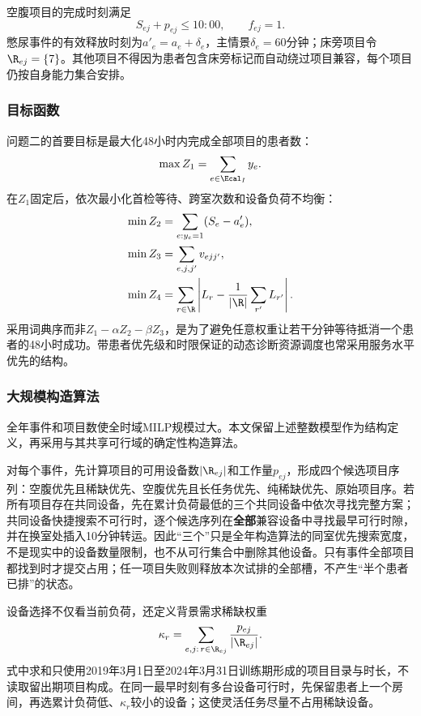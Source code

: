 空腹项目的完成时刻满足
\begin{equation}
  S_{ej}+p_{ej}\leq 10{:}00,
  \qquad f_{ej}=1.
\end{equation}
憋尿事件的有效释放时刻为$a'_e=a_e+\delta_e$，主情景$\delta_e=60$分钟；床旁项目令$\R_{ej}=\{7\}$。其他项目不得因为患者包含床旁标记而自动绕过项目兼容，每个项目仍按自身能力集合安排。

\subsubsection{目标函数}

问题二的首要目标是最大化48小时内完成全部项目的患者数：
\begin{equation}
  \max Z_1=\sum_{e\in\Ecal_I}y_e.
  \label{eq:p2-primary}
\end{equation}
在$Z_1$固定后，依次最小化首检等待、跨室次数和设备负荷不均衡：
\begin{align}
  \min Z_2&=\sum_{e:y_e=1}(S_e-a'_e),\\
  \min Z_3&=\sum_{e,j,j'}v_{ejj'},\\
  \min Z_4&=\sum_{r\in\R}\left|L_r-\frac{1}{|\R|}\sum_{r'}L_{r'}\right|.
\end{align}
采用词典序而非$Z_1-\alpha Z_2-\beta Z_3$，是为了避免任意权重让若干分钟等待抵消一个患者的48小时成功。带患者优先级和时限保证的动态诊断资源调度也常采用服务水平优先的结构\cite{patrick2008,bauerhenne2026}。

\subsubsection{大规模构造算法}

全年事件和项目数使全时域MILP规模过大。本文保留上述整数模型作为结构定义，再采用与其共享可行域的确定性构造算法。

对每个事件，先计算项目的可用设备数$|\R_{ej}|$和工作量$p_{ej}$，形成四个候选项目序列：空腹优先且稀缺优先、空腹优先且长任务优先、纯稀缺优先、原始项目序。若所有项目存在共同设备，先在累计负荷最低的三个共同设备中依次寻找完整方案；共同设备快捷搜索不可行时，逐个候选序列在\textbf{全部}兼容设备中寻找最早可行时隙，并在换室处插入10分钟转运。因此“三个”只是全年构造算法的同室优先搜索宽度，不是现实中的设备数量限制，也不从可行集合中删除其他设备。只有事件全部项目都找到时才提交占用；任一项目失败则释放本次试排的全部槽，不产生“半个患者已排”的状态。

设备选择不仅看当前负荷，还定义背景需求稀缺权重
\begin{equation}
  \kappa_r=\sum_{e,j:\,r\in\R_{ej}}\frac{p_{ej}}{|\R_{ej}|}.
\end{equation}
式中求和只使用2019年3月1日至2024年3月31日训练期形成的项目目录与时长，不读取留出期项目构成。在同一最早时刻有多台设备可行时，先保留患者上一个房间，再选累计负荷低、$\kappa_r$较小的设备；这使灵活任务尽量不占用稀缺设备。

